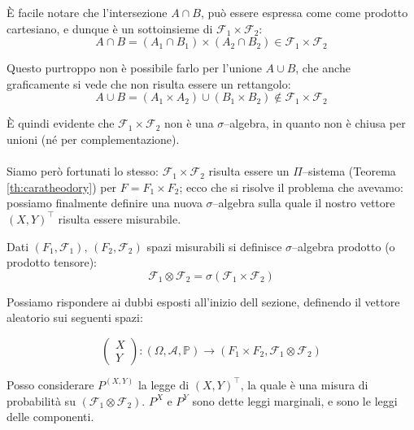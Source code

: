 È facile notare che l'intersezione $A\cap B$, può essere espressa come come prodotto cartesiano, e dunque è un sottoinsieme di $\mathcal{F}_1\times\mathcal{F}_2$:
\[A\cap B = (A_1 \cap B_1)\times (A_2\cap B_2) \in \mathcal{F}_1\times\mathcal{F}_2\]

Questo purtroppo non è possibile farlo per l'unione $A\cup B$, che anche graficamente si vede che non risulta essere un rettangolo:
\[A\cup B = (A_1\times A_2)\cup (B_1\times B_2) \notin \mathcal{F}_1\times\mathcal{F}_2\]

\noindent È quindi evidente che $\mathcal{F}_1\times\mathcal{F}_2$ non è una $\sigma$--algebra, in quanto non è chiusa per unioni (né per complementazione).\\
\\
Siamo però fortunati lo stesso: $\mathcal{F}_1\times\mathcal{F}_2$ risulta essere un $\Pi$--sistema (Teorema \ref{th:caratheodory}) per $F = F_1 \times F_2$; ecco che si risolve il problema che avevamo: possiamo finalmente definire una nuova $\sigma$--algebra sulla quale il nostro vettore $(X, Y)^\top$ risulta essere misurabile.

\begin{definizione}
    Dati $(F_1, \mathcal{F}_1), \,(F_2, \mathcal{F}_2)$ spazi misurabili si definisce $\sigma$--algebra prodotto (o prodotto tensore):
    \[\mathcal{F}_1 \otimes\mathcal{F}_2 = \sigma(\mathcal{F}_1 \times\mathcal{F}_2)\]
\end{definizione}

\noindent Possiamo rispondere ai dubbi esposti all'inizio dell sezione, definendo il vettore aleatorio sui seguenti spazi:

\[\begin{pmatrix} X\\Y \end{pmatrix} :(\Omega, \mathcal{A}, \mathbb{P})\to (F_1 \times F_2, \mathcal{F}_1 \otimes\mathcal{F}_2)\]

Posso considerare $P^{(X, Y)}$ la legge di $(X, Y)^\top$, la quale è una misura di probabilità su $(\mathcal{F}_1 \otimes\mathcal{F}_2)$. $P^X$ e $P^Y$ sono dette leggi marginali, e sono le leggi delle componenti.

